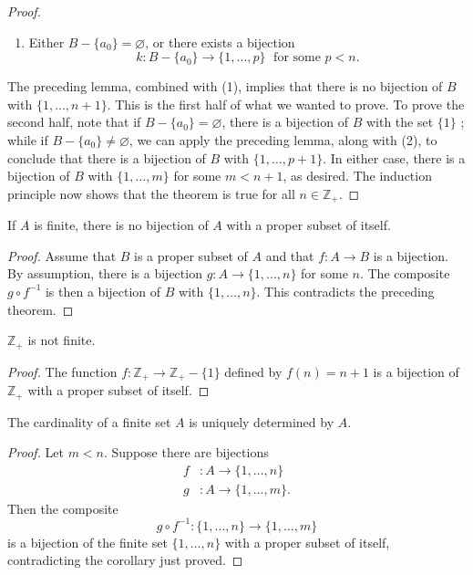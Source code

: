 \begin{proof}
\begin{enumerate}[itemsep=0.2em, parsep=0pt, topsep=0pt, partopsep=0pt, leftmargin=*, label=(\arabic*), align=left]
 \item Either \(B - \{ a_{0}\} = \varnothing\), or there exists a bijection
 \[
 k : B - \{ a_{0}\} \rightarrow \{1,\ldots, p\} \;\text{ for some }p < n.
 \]
 \end{enumerate}
 The preceding lemma, combined with (1), implies that there is no bijection of \(B\) with \(\{1,\ldots, n + 1\}\). This is the first half of what we wanted to prove. To prove the second half, note that if \(B - \{ a_{0}\} = \varnothing\), there is a bijection of \(B\) with the set \(\{1\}\) ; while if \(B - \{ a_{0}\} \neq \varnothing\), we can apply the preceding lemma, along with (2), to conclude that there is a bijection of \(B\) with \(\{1,\ldots, p + 1\}\). In either case, there is a bijection of \(B\) with \(\{1,\ldots, m\}\) for some \(m < n + 1\), as desired. The induction principle now shows that the theorem is true for all \(n \in {\mathbb{Z}}_{+}\).
\end{proof}

\begin{corollary}
\label{cor:\thetheorem}
 If \(A\) is finite, there is no bijection of \(A\) with a proper subset of itself.
\end{corollary}

\begin{proof}
 Assume that \(B\) is a proper subset of \(A\) and that \(f : A \rightarrow B\) is a bijection. By assumption, there is a bijection \(g : A \rightarrow \{1,\ldots, n\}\) for some \(n\). The composite \(g \circ {f}^{-1}\) is then a bijection of \(B\) with \(\{1,\ldots, n\}\). This contradicts the preceding theorem.
\end{proof}

\begin{corollary}
\label{cor:\thetheorem}
 \(\mathbb{Z}_{+}\) is not finite.
\end{corollary}

\begin{proof}
 The function \(f : \mathbb{Z}_{+} \rightarrow {\mathbb{Z}}_{+} - \{1\}\) defined by \(f(n) = n + 1\) is a bijection of \(\mathbb{Z}_{+}\) with a proper subset of itself.
\end{proof}

\begin{corollary}
\label{cor:\thetheorem}
 The cardinality of a finite set \(A\) is uniquely determined by \(A\).
\end{corollary}

\begin{proof}
 Let \(m < n\). Suppose there are bijections
 \[
 \begin{aligned}
 f &: A \rightarrow \{1,\ldots, n\} \\
 g &: A \rightarrow \{1,\ldots, m\} \text{.}
 \end{aligned}
 \]
 Then the composite
 \[
 g \circ {f}^{-1} : \{1,\ldots, n\} \rightarrow \{1,\ldots, m\}
 \]
 is a bijection of the finite set \(\{1,\ldots, n\}\) with a proper subset of itself, contradicting the corollary just proved.
\end{proof}

